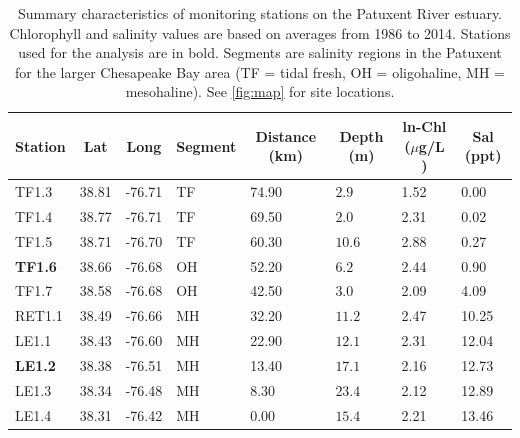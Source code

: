 \documentclass[letterpaper,12pt,oneside]{article}\usepackage[]{graphicx}\usepackage[]{color}
\newcommand{\mugl}{$\mu$g/L }
\begin{document}
\clearpage
\begin{singlespace}


\end{singlespace}
\clearpage


\begin{table}[!tbp]
\caption{Summary characteristics of monitoring stations on the Patuxent River estuary.  Chlorophyll and salinity values are based on averages from 1986 to 2014.  Stations used for the analysis are in bold.  Segments are salinity regions in the Patuxent for the larger Chesapeake Bay area (TF = tidal fresh, OH = oligohaline, MH = mesohaline).  See \cref{fig:map} for site locations.\label{tab:statsum}} 
\begin{center}
\begin{tabular}{llllllll}
\hline\hline
\multicolumn{1}{l}{Station}&\multicolumn{1}{c}{Lat}&\multicolumn{1}{c}{Long}&\multicolumn{1}{c}{Segment}&\multicolumn{1}{c}{Distance (km)}&\multicolumn{1}{c}{Depth (m)}&\multicolumn{1}{c}{ln-Chl (\mugl)}&\multicolumn{1}{c}{Sal (ppt)}\tabularnewline
\hline
TF1.3&38.81&-76.71&TF&74.90&$ 2.9$&1.52& 0.00\tabularnewline
TF1.4&38.77&-76.71&TF&69.50&$ 2.0$&2.31& 0.02\tabularnewline
TF1.5&38.71&-76.70&TF&60.30&$10.6$&2.88& 0.27\tabularnewline
{\bf TF1.6}&38.66&-76.68&OH&52.20&$ 6.2$&2.44& 0.90\tabularnewline
TF1.7&38.58&-76.68&OH&42.50&$ 3.0$&2.09& 4.09\tabularnewline
RET1.1&38.49&-76.66&MH&32.20&$11.2$&2.47&10.25\tabularnewline
LE1.1&38.43&-76.60&MH&22.90&$12.1$&2.31&12.04\tabularnewline
{\bf LE1.2}&38.38&-76.51&MH&13.40&$17.1$&2.16&12.73\tabularnewline
LE1.3&38.34&-76.48&MH& 8.30&$23.4$&2.12&12.89\tabularnewline
LE1.4&38.31&-76.42&MH& 0.00&$15.4$&2.21&13.46\tabularnewline
\hline
\end{tabular}\end{center}

\end{table}
\end{document}
